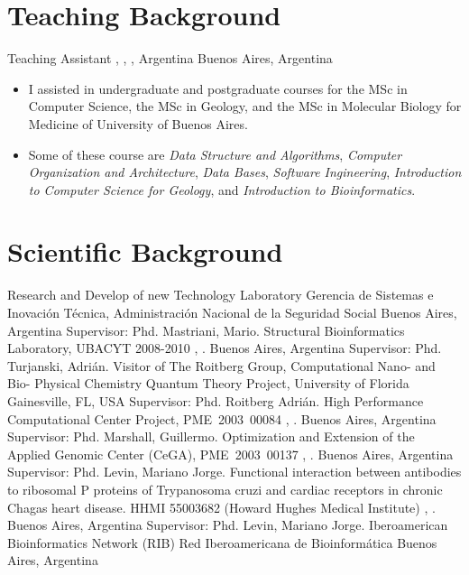 \section{Teaching Background}\label{docentes:desde}

        {Teaching Assistant}
	{\DC, \FCEN, \UBA, Argentina}
	{Buenos Aires, Argentina}
	{}
	{\begin{itemize}
	\item I assisted in undergraduate and postgraduate courses for the MSc in Computer Science,
		the MSc in Geology, and the MSc in Molecular Biology for Medicine of University of Buenos Aires.
	\item Some of these course are \emph{Data Structure and Algorithms},
		\emph{Computer Organization and Architecture}, \emph{Data Bases},
		\emph{Software Ingineering}, \emph{Introduction to Computer Science for Geology},
		and \emph{Introduction to Bioinformatics}.
	\end{itemize}}

\section{Scientific Background}\label{cientificos:desde}

	{Research and Develop of new Technology Laboratory}
	{Gerencia de Sistemas e Inovación Técnica, Administración Nacional de la Seguridad Social}
	{Buenos Aires, Argentina}
	{}
	{Supervisor: Phd. Mastriani, Mario.}
	{Structural Bioinformatics Laboratory, UBACYT 2008-2010}
	{\FCEN, \UBA.}
	{Buenos Aires, Argentina}
	{}
	{Supervisor: Phd. Turjanski, Adrián.}
        {Visitor of The Roitberg Group, Computational Nano- and Bio- Physical Chemistry}
	{Quantum Theory Project, University of Florida}
	{Gainesville, FL, USA}
	{}
	{Supervisor: Phd. Roitberg Adrián.}
	{High Performance Computational Center Project, PME~2003~00084}
	{\FCEN, \UBA.}
	{Buenos Aires, Argentina}
	{}
	{Supervisor: Phd. Marshall, Guillermo.}
        {Optimization and Extension of the Applied Genomic Center (CeGA), PME~2003~00137}
	{\FCEN, \UBA.}
	{Buenos Aires, Argentina}
	{}
	{Supervisor: Phd. Levin, Mariano Jorge.}
	{Functional interaction between antibodies to ribosomal P proteins of Trypanosoma cruzi and cardiac receptors in chronic Chagas heart disease. HHMI 55003682 (Howard Hughes Medical Institute)}
	{\FCEN, \UBA.}
	{Buenos Aires, Argentina}
	{}
	{Supervisor: Phd. Levin, Mariano Jorge.}
	{Iberoamerican Bioinformatics Network (RIB)}
	{Red Iberoamericana de Bioinformática}
	{Buenos Aires, Argentina}
	{}
	{}

